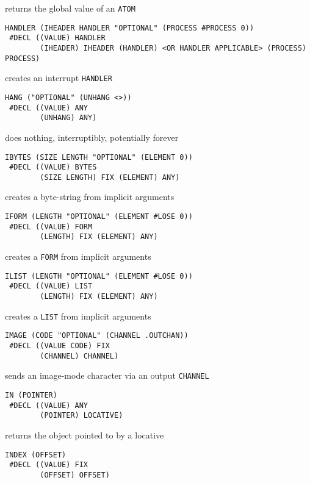 \documentclass[a4paper,]{article}
\begin{document}
returns the global value of an \texttt{ATOM}

\begin{verbatim}
HANDLER (IHEADER HANDLER "OPTIONAL" (PROCESS #PROCESS 0))
 #DECL ((VALUE) HANDLER
        (IHEADER) IHEADER (HANDLER) <OR HANDLER APPLICABLE> (PROCESS) PROCESS)
\end{verbatim}

creates an interrupt \texttt{HANDLER}

\begin{verbatim}
HANG ("OPTIONAL" (UNHANG <>))
 #DECL ((VALUE) ANY
        (UNHANG) ANY)
\end{verbatim}

does nothing, interruptibly, potentially forever

\begin{verbatim}
IBYTES (SIZE LENGTH "OPTIONAL" (ELEMENT 0))
 #DECL ((VALUE) BYTES
        (SIZE LENGTH) FIX (ELEMENT) ANY)
\end{verbatim}

creates a byte-string from implicit arguments

\begin{verbatim}
IFORM (LENGTH "OPTIONAL" (ELEMENT #LOSE 0))
 #DECL ((VALUE) FORM
        (LENGTH) FIX (ELEMENT) ANY)
\end{verbatim}

creates a \texttt{FORM} from implicit arguments

\begin{verbatim}
ILIST (LENGTH "OPTIONAL" (ELEMENT #LOSE 0))
 #DECL ((VALUE) LIST
        (LENGTH) FIX (ELEMENT) ANY)
\end{verbatim}

creates a \texttt{LIST} from implicit arguments

\begin{verbatim}
IMAGE (CODE "OPTIONAL" (CHANNEL .OUTCHAN))
 #DECL ((VALUE CODE) FIX
        (CHANNEL) CHANNEL)
\end{verbatim}

sends an image-mode character via an output \texttt{CHANNEL}

\begin{verbatim}
IN (POINTER)
 #DECL ((VALUE) ANY
        (POINTER) LOCATIVE)
\end{verbatim}

returns the object pointed to by a locative

\begin{verbatim}
INDEX (OFFSET)
 #DECL ((VALUE) FIX
        (OFFSET) OFFSET)
\end{verbatim}
\end{document}
